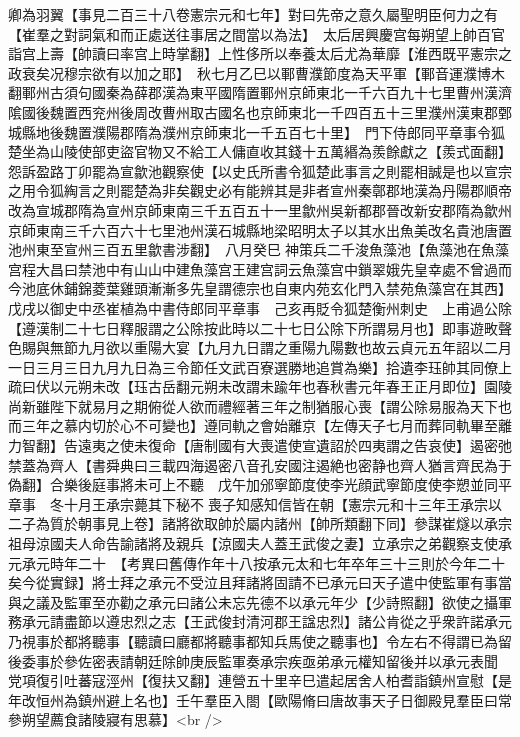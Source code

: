 卿為羽翼【事見二百三十八卷憲宗元和七年】對曰先帝之意久屬聖明臣何力之有【崔羣之對詞氣和而正處送往事居之間當以為法】　太后居興慶宫每朔望上帥百官詣宫上壽【帥讀曰率宫上時掌翻】上性侈所以奉養太后尤為華靡【淮西既平憲宗之政衰矣况穆宗欲有以加之耶】　秋七月乙巳以鄆曹濮節度為天平軍【鄆音運濮博木翻鄆州古須句國秦為薛郡漢為東平國隋置鄆州京師東北一千六百九十七里曹州漢濟隂國後魏置西兖州後周改曹州取古國名也京師東北一千四百五十三里濮州漢東郡鄄城縣地後魏置濮陽郡隋為濮州京師東北一千五百七十里】　門下侍郎同平章事令狐楚坐為山陵使部吏盜官物又不給工人傭直收其錢十五萬緡為羨餘獻之【羨式面翻】怨訴盈路丁卯罷為宣歙池觀察使【以史氏所書令狐楚此事言之則罷相誠是也以宣宗之用令狐綯言之則罷楚為非矣觀史必有能辨其是非者宣州秦鄣郡地漢為丹陽郡順帝改為宣城郡隋為宣州京師東南三千五百五十一里歙州吳新都郡晉改新安郡隋為歙州京師東南三千六百六十七里池州漢石城縣地梁昭明太子以其水出魚美改名貴池唐置池州東至宣州三百五里歙書涉翻】　八月癸巳神策兵二千浚魚藻池【魚藻池在魚藻宫程大昌曰禁池中有山山中建魚藻宫王建宫詞云魚藻宫中鎖翠娥先皇幸處不曾過而今池底休鋪錦菱葉雞頭漸漸多先皇謂德宗也自東内苑玄化門入禁苑魚藻宫在其西】　戊戌以御史中丞崔植為中書侍郎同平章事　己亥再貶令狐楚衡州刺史　上甫過公除【遵漢制二十七日釋服謂之公除按此時以二十七日公除下所謂易月也】即事遊畋聲色賜與無節九月欲以重陽大宴【九月九日謂之重陽九陽數也故云貞元五年詔以二月一日三月三日九月九日為三令節任文武百寮選勝地追賞為樂】拾遺李珏帥其同僚上疏曰伏以元朔未改【珏古岳翻元朔未改謂未踰年也春秋書元年春王正月即位】園陵尚新雖陛下就易月之期俯從人欲而禮經著三年之制猶服心喪【謂公除易服為天下也而三年之慕内切於心不可變也】遵同軌之會始離京【左傳天子七月而葬同軌畢至離力智翻】告遠夷之使未復命【唐制國有大喪遣使宣遺詔於四夷謂之告哀使】遏密弛禁蓋為齊人【書舜典曰三載四海遏密八音孔安國注遏絶也密静也齊人猶言齊民為于偽翻】合樂後庭事將未可上不聽　戊午加邠寧節度使李光顔武寧節度使李愬並同平章事　冬十月王承宗薨其下秘不喪子知感知信皆在朝【憲宗元和十三年王承宗以二子為質於朝事見上卷】諸將欲取帥於屬内諸州【帥所類翻下同】參謀崔燧以承宗祖母涼國夫人命告諭諸將及親兵【涼國夫人蓋王武俊之妻】立承宗之弟觀察支使承元承元時年二十　【考異曰舊傳作年十八按承元太和七年卒年三十三則於今年二十矣今從實録】將士拜之承元不受泣且拜諸將固請不已承元曰天子遣中使監軍有事當與之議及監軍至亦勸之承元曰諸公未忘先德不以承元年少【少詩照翻】欲使之攝軍務承元請盡節以遵忠烈之志【王武俊封清河郡王諡忠烈】諸公肯從之乎衆許諾承元乃視事於都將聽事【聽讀曰廳都將聽事都知兵馬使之聽事也】令左右不得謂已為留後委事於參佐密表請朝廷除帥庚辰監軍奏承宗疾亟弟承元權知留後并以承元表聞　党項復引吐蕃寇涇州【復扶又翻】連營五十里辛巳遣起居舍人柏耆詣鎮州宣慰【是年改恒州為鎮州避上名也】壬午羣臣入閤【歐陽脩曰唐故事天子日御殿見羣臣曰常參朔望薦食諸陵寢有思慕】<br />
